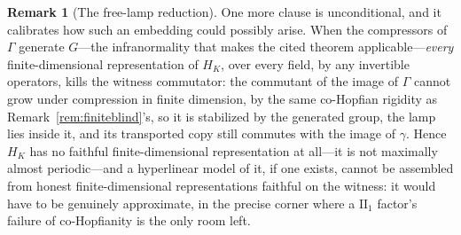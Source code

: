 \documentclass[11pt]{amsart}
\theoremstyle{definition}
\newtheorem{remark}[theorem]{Remark}
\theoremstyle{plain}
\begin{document}
\begin{remark}[The free-lamp reduction]
One more clause is unconditional, and it calibrates how such an embedding could possibly arise.  When the compressors of \(\Gamma\) generate \(G\)---the infranormality that makes the cited theorem applicable---\emph{every} finite-dimensional representation of \(H_K\), over every field, by any invertible operators, kills the witness commutator: the commutant of the image of \(\Gamma\) cannot grow under compression in finite dimension, by the same co-Hopfian rigidity as Remark~\ref{rem:finiteblind}'s, so it is stabilized by the generated group, the lamp lies inside it, and its transported copy still commutes with the image of \(\gamma\).  Hence \(H_K\) has no faithful finite-dimensional representation at all---it is not maximally almost periodic---and a hyperlinear model of it, if one exists, cannot be assembled from honest finite-dimensional representations faithful on the witness: it would have to be genuinely approximate, in the precise corner where a \(\mathrm{II}_1\) factor's failure of co-Hopfianity is the only room left.
\end{remark}
\end{document}
